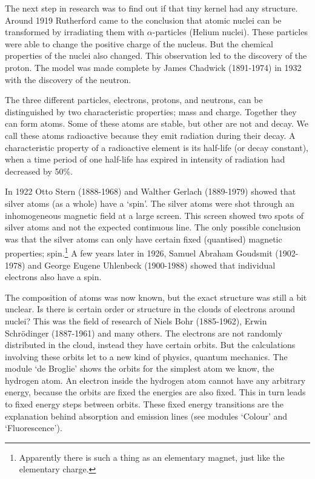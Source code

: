 The next step in research was to find out if that tiny kernel had any structure. Around 1919 Rutherford came to the conclusion that atomic nuclei can be transformed by irradiating them with $\alpha$-particles (Helium nuclei). These particles were able to change the positive charge of the nucleus. But the chemical properties of the nuclei also changed. This observation led to the discovery of the proton. The model was made complete by James Chadwick (1891-1974) in 1932 with the discovery of the neutron.

The three different particles, electrons, protons, and neutrons, can be distinguished by two characteristic properties; mass and charge. Together they can form atoms. Some of these atoms are stable, but other are not and decay. We call these atoms radioactive because they emit radiation during their decay. A characteristic property of a radioactive element is its half-life (or decay constant), when a time period of one half-life has expired in intensity of radiation had decreased by 50\%.

In 1922 Otto Stern (1888-1968) and Walther Gerlach (1889-1979) showed that silver atoms (as a whole) have a `spin'. The silver atoms were shot through an inhomogeneous magnetic field at a large screen. This screen showed two spots of silver atoms and not the expected continuous line. The only possible conclusion was that the silver atoms can only have certain fixed (quantised) magnetic properties; spin.\footnote{Apparently there is such a thing as an elementary magnet, just like the elementary charge.} A few years later in 1926, Samuel Abraham Goudsmit (1902-1978) and George Eugene Uhlenbeck (1900-1988) showed that individual electrons also have a spin.

The composition of atoms was now known, but the exact structure was still a bit unclear. Is there is certain order or structure in the clouds of electrons around nuclei? This was the field of research of Niels Bohr (1885-1962), Erwin Schr\"odinger (1887-1961) and many others. The electrons are not randomly distributed in the cloud, instead they have certain orbits. But the calculations involving these orbits let to a new kind of physics, quantum mechanics. The module `de Broglie' shows the orbits for the simplest atom we know, the hydrogen atom. An electron inside the hydrogen atom cannot have any arbitrary energy, because the orbits are fixed the energies are also fixed. This in turn leads to fixed energy steps between orbits. These fixed energy transitions are the explanation behind absorption and emission lines (see modules `Colour' and `Fluorescence').

